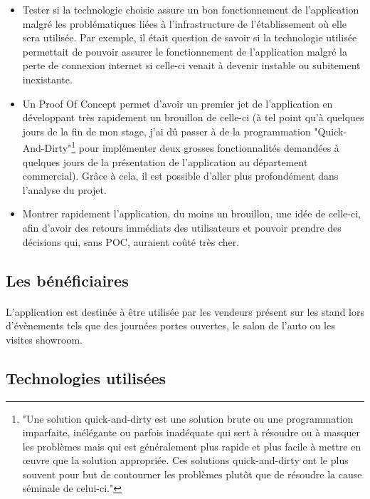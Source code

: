 \documentclass[12pt]{report}
\begin{document}
\begin{itemize}
\setlength{\itemsep}{10pt} %
\item Tester si la technologie choisie assure un bon fonctionnement de l'application malgré les problématiques liées à l'infrastructure de l'établissement où elle sera utilisée. Par exemple, il était question de savoir si la technologie utilisée permettait de pouvoir assurer le fonctionnement de l'application malgré la perte de connexion internet si celle-ci venait à devenir instable ou subitement inexistante.

\item Un Proof Of Concept permet d'avoir un premier jet de l'application en développant très rapidement un brouillon de celle-ci (à tel point qu'à quelques jours de la fin de mon stage, j'ai dû passer à de la programmation "Quick-And-Dirty"\footnote{"Une solution quick-and-dirty est une solution brute ou une programmation imparfaite, inélégante ou parfois inadéquate qui sert à résoudre ou à masquer les problèmes mais qui est généralement plus rapide et plus facile à mettre en œuvre que la solution appropriée. Ces solutions quick-and-dirty ont le plus souvent pour but de contourner les problèmes plutôt que de résoudre la cause séminale de celui-ci."\cite{QD} } pour implémenter deux grosses fonctionnalités demandées à quelques jours de la présentation de l'application au département commercial). Grâce à cela, il est possible d'aller plus profondément dans l'analyse du projet.

\item Montrer rapidement l'application, du moins un brouillon, une idée de celle-ci, afin d'avoir des retours immédiats des utilisateurs et pouvoir prendre des décisions qui, sans POC, auraient coûté très cher.

\end{itemize}

\subsection{Les bénéficiaires}
\paragraph{}
L'application est destinée à être utilisée par les vendeurs présent sur les stand lors d'évènements tels que des journées portes ouvertes, le salon de l'auto ou les visites showroom.

\subsection{Technologies utilisées}
\end{document}

